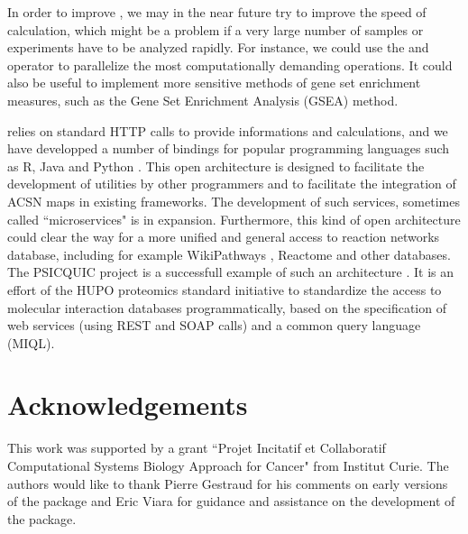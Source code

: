 In order to improve , we may in the near future try to improve
the speed of calculation, which might be a problem if a very large number of
samples or experiments have to be analyzed rapidly. For instance, we could use
the  and  operator to parallelize the most
computationally demanding operations. It could also be useful to implement more
sensitive methods of gene set enrichment measures, such as the Gene Set
Enrichment Analysis (GSEA) method. 

 relies on standard HTTP calls to provide informations and
calculations, and we have developped a number of bindings for popular
programming languages such as R, Java and Python \citep{bonnet2015navicell}.
This open architecture is designed to facilitate the development of utilities
by other programmers and to facilitate the integration of ACSN maps in existing
frameworks. The development of such services, sometimes called ``microservices"
\citep{fowler2014} is in expansion. Furthermore, this kind of open architecture
could clear the way for a more unified and general access to reaction networks
database, including for example WikiPathways \citep{kelder2012wikipathways},
Reactome \citep{croft2014reactome} and other databases. The PSICQUIC project is
a successfull example of such an architecture \citep{aranda2011psicquic}. It is
an effort of the HUPO proteomics standard initiative to standardize the access
to molecular interaction databases programmatically, based on the specification
of web services (using REST and SOAP calls) and a common query language (MIQL).

\section[Acknowledgments]{Acknowledgements}

This work was supported by a grant ``Projet Incitatif et Collaboratif
Computational Systems Biology Approach for Cancer" from Institut Curie. The
authors would like to thank Pierre Gestraud for his comments on early versions
of the  package and Eric Viara for guidance and assistance on
the development of the  package.




\address{
  Paul Deveau\\
  Computational Systems Biology of Cancer, Institut Curie\\
  Genetics and Biology of Cancers, Institut Curie\\
  26, rue d'Ulm 75248 Paris\\
  France\\
}


